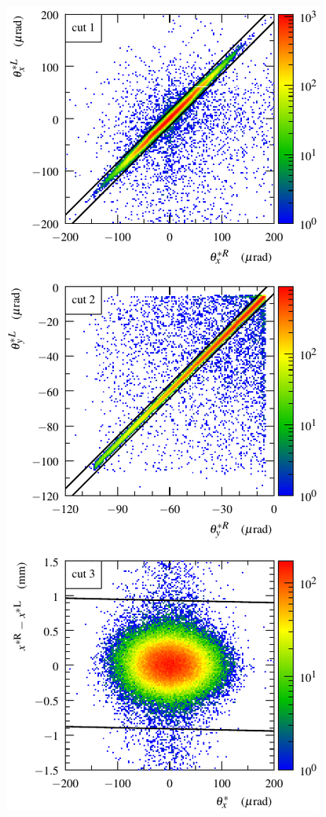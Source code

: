\begin{figure}
\begin{center}
\includegraphics{fig/cuts.pdf}
\caption{%
}
\label{fig:tag corr plots}
\end{center}
\end{figure}



